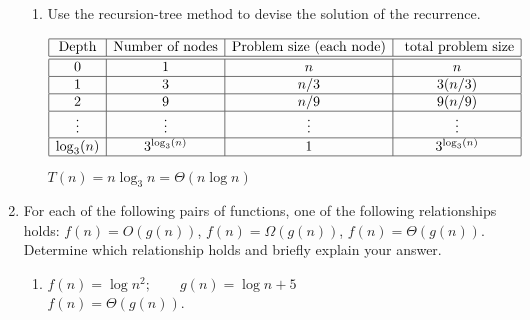 \documentclass[14pt, a4paper]{article}
\begin{document}
\begin{enumerate}
\begin{enumerate}[label={(\arabic*)}]
        \item Use the recursion-tree method to devise the solution of the recurrence.
        
        \[
            \begin{array}{|c|c|c|c|}  	%
            \hline				%
            \mbox{Depth} & \mbox{Number of nodes} & \mbox{Problem size (each node)} & \mbox{ total problem size}\\
            \hline\hline
              0       & 1             &  n   & n\\
            \hline
              1       & 3             & n/3  & 3(n/3)\\
            \hline
              2       & 9             & n/9  & 9(n/9)\\
            \hline
             \vdots & \vdots & \vdots & \vdots \\
            \hline
            \log_3(n) & 3^{\log_3(n)} & 1    & 3^{\log_3(n)}\\
            \hline
            \end{array}
        \]
        
        $T(n) = n \log_3 n = \Theta (n \log n)$ \\
    \end{enumerate}

\newcommand{\thetaEquation}{0 \le c_1 g(n_0) \le f(n_0) \le c_2 g(n_0)}
\newcommand{\thetaExpr}{f(n) = \Theta (g(n))}
\newcommand{\omegaExpr}{f(n) = \Omega (g(n))}
\newcommand{\ohExpr}{f(n) = O(g(n))}
\item For each of the following pairs of functions, one of the following relationships holds:
$f(n) = O(g(n))$, $f(n) = \Omega (g(n))$, $f(n) = \Theta (g(n))$. Determine which relationship holds and briefly explain your answer.

    \begin{enumerate}[label=\alph*.]
    \newcommand{\tab}{\hspace{1em}}
    \item $f(n) = \log n^2; \tab \hspace{1em} g(n) = \log n + 5$ \\
    
        $\thetaExpr$.\\ 
        

\end{enumerate}
\end{enumerate}
\end{document}
